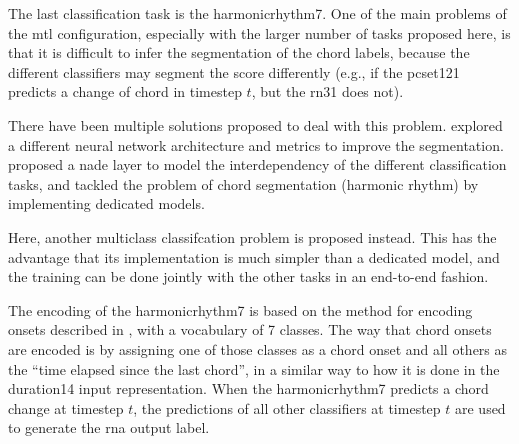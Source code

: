 
The last classification task is the \gls{harmonicrhythm7}.
One of the main problems of the \gls{mtl} configuration,
especially with the larger number of tasks proposed here, is
that it is difficult to infer the segmentation of the chord
labels, because the different classifiers may segment the
score differently (e.g., if the \gls{pcset121} predicts a
change of chord in timestep $t$, but the \gls{rn31} does
not).

There have been multiple solutions proposed to deal with
this problem. \textcite{chen2021attend} explored a different
neural network architecture and metrics to improve the
segmentation. \textcite{micchi2021deep} proposed a
\gls{nade} layer to model the interdependency of the
different classification tasks, \textcite{mcleod2021modular}
and  \textcite{wu2021melody} tackled the problem of chord
segmentation (harmonic rhythm) by implementing dedicated
models. 

Here, another multiclass classifcation problem is proposed
instead. This has the advantage that its implementation is
much simpler than a dedicated model, and the training can be
done jointly with the other tasks in an end-to-end fashion.

The encoding of the \gls{harmonicrhythm7} is based on the
method for encoding onsets described in
, with a
vocabulary of 7 classes. The way that chord onsets are
encoded is by assigning one of those classes as a chord
onset and all others as the ``time elapsed since the last
chord'', in a similar way to how it is done in the
\gls{duration14} input representation. When the
\gls{harmonicrhythm7} predicts a chord change at timestep
$t$, the predictions of all other classifiers at timestep
$t$ are used to generate the \gls{rna} output label.
